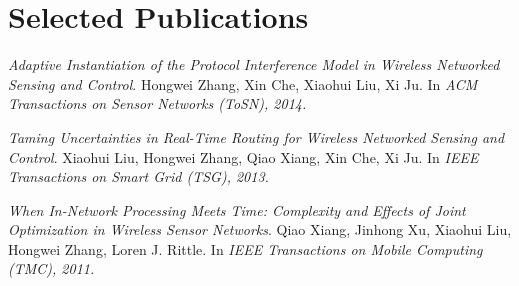 
\section{Selected Publications}
\begin{thebibliography}{3}
\emph{Adaptive Instantiation of the Protocol Interference Model in Wireless Networked Sensing and Control}. Hongwei Zhang, Xin Che, Xiaohui Liu, Xi Ju. In \emph{ACM Transactions on Sensor Networks (ToSN), 2014.}

\emph{Taming Uncertainties in Real-Time Routing for Wireless Networked Sensing and Control}. Xiaohui Liu, Hongwei Zhang, Qiao Xiang, Xin Che, Xi Ju. In \emph{IEEE Transactions on Smart Grid (TSG), 2013.}

\emph{When In-Network Processing Meets Time: Complexity and Effects of Joint Optimization in Wireless Sensor Networks}. Qiao Xiang, Jinhong Xu, Xiaohui Liu, Hongwei Zhang, Loren J. Rittle. In \emph{IEEE Transactions on Mobile Computing (TMC), 2011.}




\end{thebibliography}

